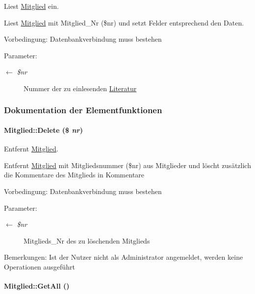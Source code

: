Liest \hyperlink{classMitglied}{Mitglied} ein. 

Liest \hyperlink{classMitglied}{Mitglied} mit Mitglied\_\-Nr (\$nr) und setzt Felder entsprechend den Daten. \begin{Desc}
\item[Vorbedingung:]Datenbankverbindung muss bestehen \end{Desc}
\begin{Desc}
\item[Parameter:]
\begin{description}
\item[\mbox{$\leftarrow$} {\em \$nr}]Nummer der zu einlesenden \hyperlink{classLiteratur}{Literatur} \end{description}
\end{Desc}


\subsubsection{Dokumentation der Elementfunktionen}
\hypertarget{classMitglied_c6900c12663e9b228bf9942fc045b8b4}{
\paragraph[Delete]{\setlength{\rightskip}{0pt plus 5cm}Mitglied::Delete (\$ {\em nr})}\hfill}
\label{classMitglied_c6900c12663e9b228bf9942fc045b8b4}


Entfernt \hyperlink{classMitglied}{Mitglied}. 

Entfernt \hyperlink{classMitglied}{Mitglied} mit Mitgliedsnummer (\$nr) aus Mitglieder und löscht zusätzlich die Kommentare des Mitglieds in Kommentare \begin{Desc}
\item[Vorbedingung:]Datenbankverbindung muss bestehen \end{Desc}
\begin{Desc}
\item[Parameter:]
\begin{description}
\item[\mbox{$\leftarrow$} {\em \$nr}]Mitglieds\_\-Nr des zu löschenden Mitglieds \end{description}
\end{Desc}
\begin{Desc}
\item[Bemerkungen:]Ist der Nutzer nicht als Administrator angemeldet, werden keine Operationen ausgeführt \end{Desc}
\hypertarget{classMitglied_70ce63c9c9a7159966dc9e80a7f726a2}{
\paragraph[GetAll]{\setlength{\rightskip}{0pt plus 5cm}Mitglied::Get\-All ()}\hfill}
\label{classMitglied_70ce63c9c9a7159966dc9e80a7f726a2}


